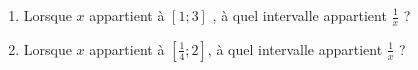 
\begin{enumerate}
\item Lorsque $x$ appartient à $[1;3]$ , à quel intervalle appartient $\frac{1}{x}$ ? 
\item Lorsque $x$ appartient à $\left[\frac{1}{4};2 \right]$, à quel intervalle appartient $\frac{1}{x}$ ?
\end{enumerate}